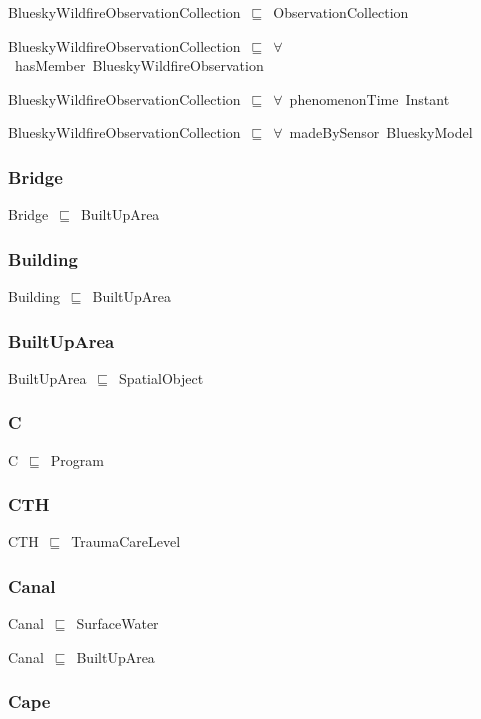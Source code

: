 \documentclass{article}
\begin{document}
BlueskyWildfireObservationCollection~\ensuremath{\sqsubseteq}~ObservationCollection~

BlueskyWildfireObservationCollection~\ensuremath{\sqsubseteq}~\ensuremath{\forall}~hasMember~BlueskyWildfireObservation~

BlueskyWildfireObservationCollection~\ensuremath{\sqsubseteq}~\ensuremath{\forall}~phenomenonTime~Instant~

BlueskyWildfireObservationCollection~\ensuremath{\sqsubseteq}~\ensuremath{\forall}~madeBySensor~BlueskyModel~

\subsubsection*{Bridge}

Bridge~\ensuremath{\sqsubseteq}~BuiltUpArea~

\subsubsection*{Building}

Building~\ensuremath{\sqsubseteq}~BuiltUpArea~

\subsubsection*{BuiltUpArea}

BuiltUpArea~\ensuremath{\sqsubseteq}~SpatialObject~

\subsubsection*{C}

C~\ensuremath{\sqsubseteq}~Program~

\subsubsection*{CTH}

CTH~\ensuremath{\sqsubseteq}~TraumaCareLevel~

\subsubsection*{Canal}

Canal~\ensuremath{\sqsubseteq}~SurfaceWater~

Canal~\ensuremath{\sqsubseteq}~BuiltUpArea~

\subsubsection*{Cape}
\end{document}
